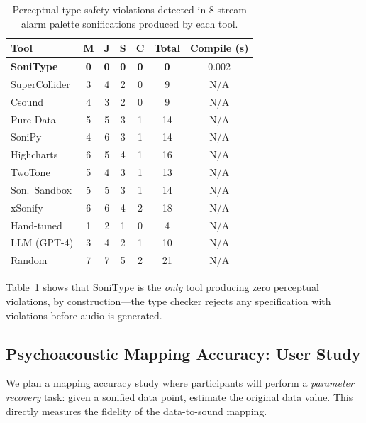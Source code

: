 \documentclass[sigchi, nonacm]{acmart}
\begin{document}
\begin{table}[t]
\centering
\caption{Perceptual type-safety violations detected in 8-stream alarm palette sonifications produced by each tool. }
\label{tab:violations}
\small
\begin{tabular}{lcccccc}
\toprule
\textbf{Tool} & \textbf{M} & \textbf{J} & \textbf{S} & \textbf{C} & \textbf{Total} & \textbf{Compile (s)} \\
\midrule
\textbf{SoniType} & \textbf{0} & \textbf{0} & \textbf{0} & \textbf{0} & \textbf{0} & 0.002 \\
SuperCollider & 3 & 4 & 2 & 0 & 9 & N/A \\
Csound & 4 & 3 & 2 & 0 & 9 & N/A \\
Pure Data & 5 & 5 & 3 & 1 & 14 & N/A \\
SoniPy & 4 & 6 & 3 & 1 & 14 & N/A \\
Highcharts & 6 & 5 & 4 & 1 & 16 & N/A \\
TwoTone & 5 & 4 & 3 & 1 & 13 & N/A \\
Son.\ Sandbox & 5 & 5 & 3 & 1 & 14 & N/A \\
xSonify & 6 & 6 & 4 & 2 & 18 & N/A \\
Hand-tuned & 1 & 2 & 1 & 0 & 4 & N/A \\
LLM (GPT-4) & 3 & 4 & 2 & 1 & 10 & N/A \\
Random & 7 & 7 & 5 & 2 & 21 & N/A \\
\bottomrule
\end{tabular}
\end{table}

Table~\ref{tab:violations} shows that SoniType is the \emph{only} tool producing zero perceptual violations, by construction---the type checker rejects any specification with violations before audio is generated.

\subsection{Psychoacoustic Mapping Accuracy: User Study}
\label{sec:mapping_accuracy}

We plan a mapping accuracy study where participants will perform a \emph{parameter recovery} task: given a sonified data point, estimate the original data value. This directly measures the fidelity of the data-to-sound mapping.
\end{document}
